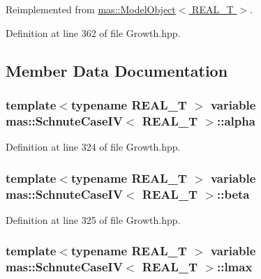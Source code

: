Reimplemented from \hyperlink{structmas_1_1_model_object_a8eaf6c7c52e42ea8869aefa318358cb5}{mas\-::\-Model\-Object$<$ R\-E\-A\-L\-\_\-\-T $>$}.



Definition at line 362 of file Growth.\-hpp.



\subsection{Member Data Documentation}
\hypertarget{structmas_1_1_schnute_case_i_v_a1ff44a6bb870b3ba1d553b5a4d17bd39}{
\subsubsection[{alpha}]{\setlength{\rightskip}{0pt plus 5cm}template$<$typename R\-E\-A\-L\-\_\-\-T $>$ {\bf variable} {\bf mas\-::\-Schnute\-Case\-I\-V}$<$ R\-E\-A\-L\-\_\-\-T $>$\-::alpha}}\label{structmas_1_1_schnute_case_i_v_a1ff44a6bb870b3ba1d553b5a4d17bd39}


Definition at line 324 of file Growth.\-hpp.

\hypertarget{structmas_1_1_schnute_case_i_v_a11a7d5e338909eca6126bd1384a5b0b5}{
\subsubsection[{beta}]{\setlength{\rightskip}{0pt plus 5cm}template$<$typename R\-E\-A\-L\-\_\-\-T $>$ {\bf variable} {\bf mas\-::\-Schnute\-Case\-I\-V}$<$ R\-E\-A\-L\-\_\-\-T $>$\-::beta}}\label{structmas_1_1_schnute_case_i_v_a11a7d5e338909eca6126bd1384a5b0b5}


Definition at line 325 of file Growth.\-hpp.

\hypertarget{structmas_1_1_schnute_case_i_v_afadfbcde5becffb86f6049bbd59ef09c}{
\subsubsection[{lmax}]{\setlength{\rightskip}{0pt plus 5cm}template$<$typename R\-E\-A\-L\-\_\-\-T $>$ {\bf variable} {\bf mas\-::\-Schnute\-Case\-I\-V}$<$ R\-E\-A\-L\-\_\-\-T $>$\-::lmax}}\label{structmas_1_1_schnute_case_i_v_afadfbcde5becffb86f6049bbd59ef09c}


